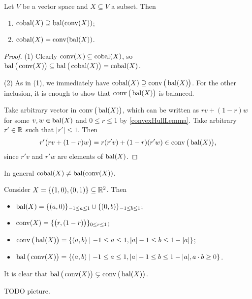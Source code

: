 \begin{lemma} \label{diskedIsCoBal}
Let $V$ be a vector space and $X\subseteq V$ a subset. Then
\begin{enumerate}
\item $\operatorname{cobal}(X) \supseteq \operatorname{bal}(\operatorname{conv}(X))$;
\item $\operatorname{cobal}(X) = \operatorname{conv}(\operatorname{bal}(X))$.
\end{enumerate}
\end{lemma}
\begin{proof}
(1) Clearly $\operatorname{conv}(X) \subseteq \operatorname{cobal}(X)$, so $\operatorname{bal}\big(\operatorname{conv}(X)\big) \subseteq \operatorname{bal}\big(\operatorname{cobal}(X)\big) = \operatorname{cobal}(X)$.

(2) As in (1), we immediately have $\operatorname{cobal}(X) \supseteq \operatorname{conv}\big(\operatorname{bal}(X)\big)$. For the other inclusion, it is enough to show that $\operatorname{conv}\big(\operatorname{bal}(X)\big)$ is balanced.

Take arbitrary vector in $\operatorname{conv}\big(\operatorname{bal}(X)\big)$, which can be written as $rv + (1-r)w$ for some $v,w\in \operatorname{bal}(X)$ and $0\leq r\leq 1$ by \ref{convexHullLemma}. Take arbitrary $r'\in \mathbb{R}$ such that $|r'|\leq 1$. Then
\[ r'\big(rv + (1-r)w\big) = r(r'v) + (1-r)(r'w) \in \operatorname{conv}\big(\operatorname{bal}(X)\big), \]
since $r'v$ and $r'w$ are elements of $\operatorname{bal}(X)$.
\end{proof}

\begin{example}
In general $\operatorname{cobal}(X) \neq \operatorname{bal}(\operatorname{conv}(X))$.

Consider $X= \{(1,0), (0,1)\}\subseteq \mathbb{R}^2$. Then
\begin{itemize}
\item $\operatorname{bal}(X) = \{(a,0)\}_{-1\leq a\leq 1} \cup \{(0,b)\}_{-1\leq b\leq 1}$;
\item $\operatorname{conv}(X) = \{\big(r,(1-r)\big)\}_{0\leq r\leq 1}$;
\item $\convex\big(\balanced(X)\big) = \setbuilder{(a,b)}{-1\leq a\leq 1, |a|-1 \leq b\leq 1-|a|}$;
\item $\balanced\big(\convex(X)\big) = \setbuilder{(a,b)}{-1\leq a\leq 1, |a|-1 \leq b\leq 1-|a|, a\cdot b\geq 0}$.
\end{itemize}
It is clear that $\operatorname{bal}\big(\operatorname{conv}(X)\big) \subsetneq \operatorname{conv}\big(\operatorname{bal}(X)\big)$.

TODO picture.
\end{example}

